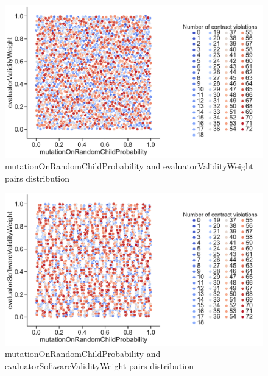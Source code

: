 \begin{figure}
	\centering
	\includegraphics[width=\textwidth]{images/PairsDistr/mutationOnRandomChildProbability_evaluatorValidityWeight.pdf}
	\caption[mutationOnRandomChildProbability and evaluatorValidityWeight pairs distribution]{mutationOnRandomChildProbability and evaluatorValidityWeight pairs distribution}
	\label{fig:mutationOnRandomChildProbability_evaluatorValidityWeight_pair}
\end{figure}
\begin{figure}
	\centering
	\includegraphics[width=\textwidth]{images/PairsDistr/mutationOnRandomChildProbability_evaluatorSoftwareValidityWeight.pdf}
	\caption[mutationOnRandomChildProbability and evaluatorSoftwareValidityWeight pairs distribution]{mutationOnRandomChildProbability and evaluatorSoftwareValidityWeight pairs distribution}   
	\label{fig:mutationOnRandomChildProbability_evaluatorSoftwareValidityWeight_pair}
\end{figure}
